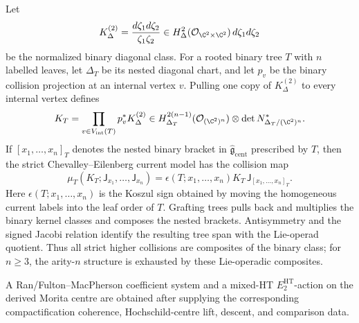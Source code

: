 \documentclass[11pt]{memoir}
\begin{document}
\begin{prop}
\label{prop:diagonal-cohomology-operad}
  Let
  \[
    K^{(2)}_\Delta
    =\frac{d\zeta_1d\zeta_2}{\zeta_1\zeta_2}
    \in H^2_\Delta
      (\mathcal O_{\C^2\times\C^2})\,d\zeta_1d\zeta_2
  \]
  be the normalized binary diagonal class.  For a rooted binary tree
  \(T\) with \(n\) labelled leaves, let \(\Delta_T\) be its nested
  diagonal chart, and let \(p_v\) be the binary collision projection at
  an internal vertex \(v\).  Pulling one copy of
  \(K^{(2)}_\Delta\) to every internal vertex defines
  \[
    K_T=\prod_{v\in V_{\mathrm{int}}(T)}p_v^*K^{(2)}_\Delta
    \in H^{2(n-1)}_{\Delta_T}(\mathcal O_{(\C^2)^n})
       \otimes\det N^*_{\Delta_T/(\C^2)^n}.
  \]
  If \([x_1,\ldots,x_n]_T\) denotes the nested binary bracket in
  \(\widehat{\mathfrak g}_{\mathrm{cent}}\) prescribed by \(T\), then
  the strict Chevalley--Eilenberg current model has the collision map
  \[
    \mu_T(K_T;\mathsf J_{x_1},\ldots,\mathsf J_{x_n})
    =\epsilon(T;x_1,\ldots,x_n)K_T\,
      \mathsf J_{[x_1,\ldots,x_n]_T}.
  \]
  Here \(\epsilon(T;x_1,\ldots,x_n)\) is the Koszul sign obtained by
  moving the homogeneous current labels into the leaf order of \(T\).
  Grafting trees pulls back and multiplies the binary kernel classes and
  composes the nested brackets.  Antisymmetry and the signed Jacobi
  relation identify the resulting tree span with the Lie-operad quotient.
  Thus all strict higher collisions are composites of the binary class;
  for \(n\geq3\), the arity-\(n\) structure is exhausted by these
  Lie-operadic composites.

  A Ran/Fulton--MacPherson coefficient system and a mixed-HT
  \(E_2^{\mathrm{HT}}\)-action on the derived Morita centre are obtained
  after supplying the corresponding compactification coherence,
  Hochschild-centre lift, descent, and comparison data.
\end{prop}
\end{document}
